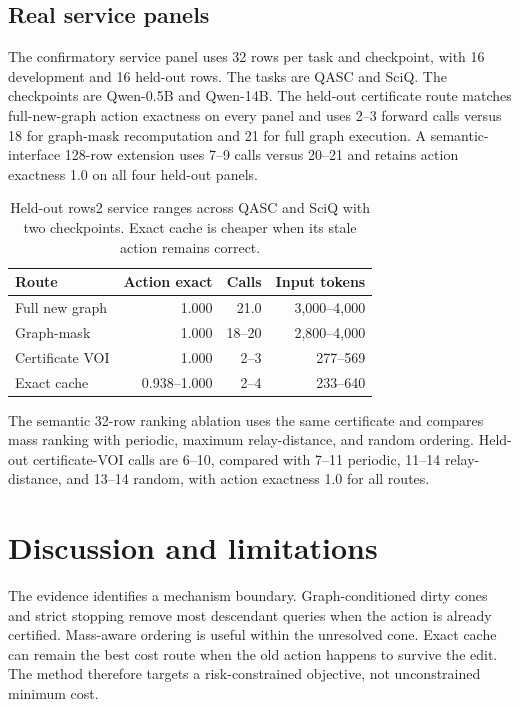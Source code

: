 \documentclass[11pt]{article}
\begin{document}
\subsection{Real service panels}
The confirmatory service panel uses 32 rows per task and checkpoint, with 16 development and 16 held-out rows. The tasks are QASC and SciQ. The checkpoints are Qwen-0.5B and Qwen-14B. The held-out certificate route matches full-new-graph action exactness on every panel and uses 2--3 forward calls versus 18 for graph-mask recomputation and 21 for full graph execution. A semantic-interface 128-row extension uses 7--9 calls versus 20--21 and retains action exactness 1.0 on all four held-out panels.

\begin{table}[t]
\centering\small
\begin{tabular}{lrrr}
\toprule
Route & Action exact & Calls & Input tokens\\
\midrule
Full new graph & 1.000 & 21.0 & 3,000--4,000\\
Graph-mask & 1.000 & 18--20 & 2,800--4,000\\
Certificate VOI & 1.000 & 2--3 & 277--569\\
Exact cache & 0.938--1.000 & 2--4 & 233--640\\
\bottomrule
\end{tabular}
\caption{Held-out rows2 service ranges across QASC and SciQ with two checkpoints. Exact cache is cheaper when its stale action remains correct.}
\end{table}

The semantic 32-row ranking ablation uses the same certificate and compares mass ranking with periodic, maximum relay-distance, and random ordering. Held-out certificate-VOI calls are 6--10, compared with 7--11 periodic, 11--14 relay-distance, and 13--14 random, with action exactness 1.0 for all routes.

\section{Discussion and limitations}
The evidence identifies a mechanism boundary. Graph-conditioned dirty cones and strict stopping remove most descendant queries when the action is already certified. Mass-aware ordering is useful within the unresolved cone. Exact cache can remain the best cost route when the old action happens to survive the edit. The method therefore targets a risk-constrained objective, not unconstrained minimum cost.
\end{document}
